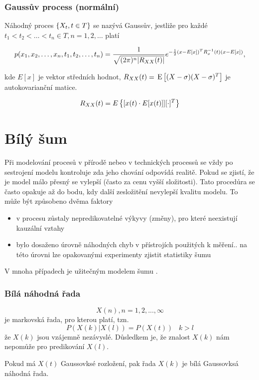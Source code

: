 \subsubsection{Gaussův process (normální)}
\label{subs:Gaussův process}

Náhodný proces $\brs{X_t,t\in T}$ se nazývá Gaussův, jestliže pro každé $t_1<t_2<\ldots<t_n\in T, n=1,2,\ldots$ platí

\[ p(\vecrow[x],\vecrow[t])=\frac{1}{\sqrt{(2\pi)^n |R_{XX}(t)|}} e^{-\frac{1}{2}(x-E[x])^T R_x^{-1}(t)(x-E[x])}, \]

kde $E[x]$ je vektor středních hodnot, $R_{XX}(t) = \mean{(X-\sigma)(X-\sigma)^T}$ je autokovarianční matice.

\[ R_{XX}(t)=E\brs{[x(t)\cdot E[x(t)]][\cdot]^T} \]


\section{Bílý šum}
\label{sec:Bílý šum}

Při modelování procesů v přírodě nebeo v technických processů se vždy po sestrojení modelu kontroluje zda jeho chování odpovídá realitě. Pokud se zjistí, že je model málo přesný se vylepší (často za cenu vyšší složitosti). Tato procedůra se často opakuje až do bodu, kdy další zesložitění nevylepší kvalitu modelu. To může být způsobeno dvěma faktory

\begin{itemize}
	\item v procesu zůstaly nepredikovatelné výkyvy (změny), pro které neexistují kauzální vztahy
	\item bylo dosaženo úrovně náhodných chyb v přístrojích použitých k měření.. na této úrovni lze opakovanými experimenty zjistit statistiky šumu
\end{itemize}

V mnoha případech je užitečným modelem šumu .

\subsubsection{Bílá náhodná řada}
\label{subs:Bílá náhodná řada}

\[ { X(n), n=1,2,...,\infty} \] je markovská řada, pro kterou platí, tzn. \[ P(X(k)|X(l)) = P(X(t)) \;\;\; k > l \] že $X(k)$ jsou vzájemně nezávyslé. Důsledkem je, že znalost $X(k)$ nám nepomůže pro predikování $X(l)$.

Pokud má $X(t)$ Gaussovksé rozložení, pak řada ${X(k)}$ je bílá Gaussovksá náhodná řada.

